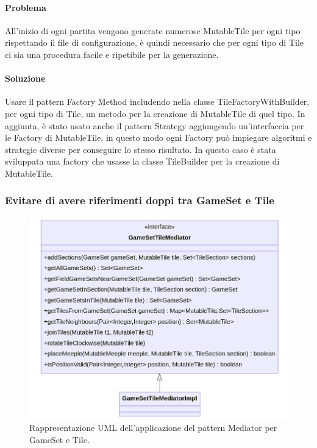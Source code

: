 \paragraph{Problema}
All'inizio di ogni partita vengono generate numerose MutableTile per ogni tipo rispettando il file di configurazione, è quindi necessario che per ogni tipo di Tile ci sia una procedura facile e ripetibile per la generazione.
\paragraph{Soluzione}
Usare il pattern Factory Method includendo nella classe TileFactoryWithBuilder, per ogni tipo di Tile, un metodo per la creazione di MutableTile di quel tipo. In aggiunta, è stato usato anche il pattern Strategy aggiungendo un'interfaccia per le Factory di MutableTile, in questo modo ogni Factory può impiegare algoritmi e strategie diverse per conseguire lo stesso risultato. In questo caso è stata sviluppata una factory che usasse la classe TileBuilder per la creazione di MutableTile.
\clearpage

\subsubsection*{Evitare di avere riferimenti doppi tra GameSet e Tile}
\begin{figure}[ht]
    \centering\includegraphics[scale=.35]{images/gamesettilemediator.png}
    \caption{Rappresentazione UML dell'applicazione del pattern Mediator per GameSet e Tile.}
\end{figure}
